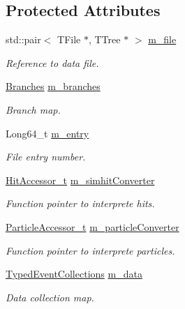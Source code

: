 \subsection*{Protected Attributes}
\begin{DoxyCompactItemize}
\item 
std::pair$<$ TFile $\ast$, TTree $\ast$ $>$ \hyperlink{class_d_d4hep_1_1_d_d_g4_event_handler_a0b53d1d20cca9b02b9f119c99832b503}{m\_\-file}
\begin{DoxyCompactList}\small\item\em Reference to data file. \item\end{DoxyCompactList}\item 
\hyperlink{class_d_d4hep_1_1_d_d_g4_event_handler_accd112cdbf8673e3a80d97e2d5c98241}{Branches} \hyperlink{class_d_d4hep_1_1_d_d_g4_event_handler_a33ae5f13b50b604cf914ba4d86aa3c35}{m\_\-branches}
\begin{DoxyCompactList}\small\item\em Branch map. \item\end{DoxyCompactList}\item 
Long64\_\-t \hyperlink{class_d_d4hep_1_1_d_d_g4_event_handler_ab28e33c8789d149c104fea42e39ba060}{m\_\-entry}
\begin{DoxyCompactList}\small\item\em File entry number. \item\end{DoxyCompactList}\item 
\hyperlink{class_d_d4hep_1_1_d_d_g4_event_handler_a2f34a2e7c2b1a6cb2c9fc1b7270d707e}{HitAccessor\_\-t} \hyperlink{class_d_d4hep_1_1_d_d_g4_event_handler_a608844b86789ef2ccc8b7d088bdb7fe6}{m\_\-simhitConverter}
\begin{DoxyCompactList}\small\item\em Function pointer to interprete hits. \item\end{DoxyCompactList}\item 
\hyperlink{class_d_d4hep_1_1_d_d_g4_event_handler_a5d1ac46722967ffdd5e1a15147d3c6bb}{ParticleAccessor\_\-t} \hyperlink{class_d_d4hep_1_1_d_d_g4_event_handler_abf82ae01b8dc3e3cfc84de48f42d4ce2}{m\_\-particleConverter}
\begin{DoxyCompactList}\small\item\em Function pointer to interprete particles. \item\end{DoxyCompactList}\item 
\hyperlink{class_d_d4hep_1_1_event_handler_a4d441ff8a824b1e2f278e8b7a6391af3}{TypedEventCollections} \hyperlink{class_d_d4hep_1_1_d_d_g4_event_handler_a11dcb61378ef3044f34723cc25aec8b7}{m\_\-data}
\begin{DoxyCompactList}\small\item\em Data collection map. \item\end{DoxyCompactList}\end{DoxyCompactItemize}


